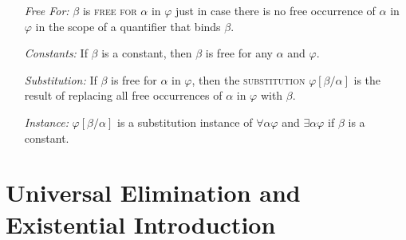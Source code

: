 \documentclass[a4paper, 11pt]{article} %
\newcommand{\qt}[2]{#1 #2} %
\newcommand{\unisub}[2]{[#1/#2]}
\begin{document}
\begin{enumerate}
  \item[\it Free For:] $\beta$ is \textsc{free for} $\alpha$ in $\varphi$ just in case there is no free occurrence of $\alpha$ in $\varphi$ in the scope of a quantifier that binds $\beta$. 
  \item[\it Constants:] If $\beta$ is a constant, then $\beta$ is free for any $\alpha$ and $\varphi$. 
  \item[\it Substitution:] If $\beta$ is free for $\alpha$ in $\varphi$, then the \textsc{substitution} $\varphi\unisub{\beta}{\alpha}$ is the result of replacing all free occurrences of $\alpha$ in $\varphi$ with $\beta$. 
  \item[\it Instance:] $\varphi\unisub{\beta}{\alpha}$ is a substitution instance of $\qt{\forall}{\alpha}\varphi$ and $\qt{\exists}{\alpha}\varphi$ if $\beta$ is a constant. 
\end{enumerate}
   




\section*{Universal Elimination and Existential Introduction}
\end{document}
